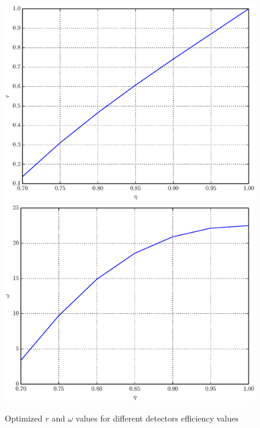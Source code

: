 \documentclass[%
master,         %
subf,           %
href,           %
colorlinks=true %
]{disser}
\numberwithin{equation}{section}
\numberwithin{figure}{section}
\begin{document}
\begin{figure}[h]
\includegraphics[scale=0.7]{r.eps}
\includegraphics[scale=0.7]{omega.eps}
\caption{Optimized $r$ and $\omega$ values for different detectors efficiency values}
\label{fig:psi_opt}
\end{figure}
\end{document}
